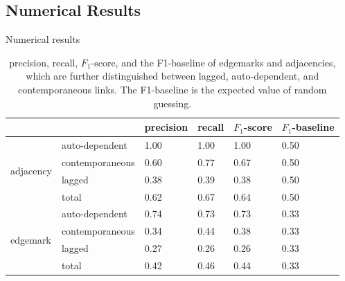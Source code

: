 \documentclass[conference]{IEEEtran}
\begin{document}
\subsection{Numerical Results}
\begin{table}[!htb]
\begin{center}
        \caption{Numerical results}
    \begin{minipage}{.5\linewidth}
        \caption[]{precision, recall, $F_1$-score, and the F1-baseline of edgemarks and adjacencies, which are further distinguished between lagged, auto-dependent, and contemporaneous links. The F1-baseline is the expected value of random guessing.}
      \centering
        \begin{tabular}{@{}llllll@{}}
            \toprule
            \textbf{}                  &         & precision      & recall  &  $F_1$-score & $F_1$-baseline    \\ \midrule
            \multirow{4}{*}{adjacency} & auto-dependent    & 1.00             & 1.00  &  1.00     & 0.50     \\
                                       & contemporaneous & 0.60             & 0.77  &  0.67     & 0.50     \\
                                       & lagged  & 0.38             & 0.39  &  0.38     & 0.50     \\
                                       & total   & 0.62             & 0.67  &  0.64     & 0.50     \\ \midrule
            \multirow{4}{*}{edgemark}  & auto-dependent    & 0.74             & 0.73  &  0.73     & 0.33     \\
                                       & contemporaneous & 0.34             & 0.44  &  0.38     & 0.33     \\
                                       & lagged  & 0.27             & 0.26  &  0.26     & 0.33      \\
                                       & total   & 0.42             & 0.46  &  0.44     & 0.33     \\ 
            \end{tabular}
            \label{tab:precision_recall}
    \end{minipage}%

\end{center}
\end{table}
\end{document}
